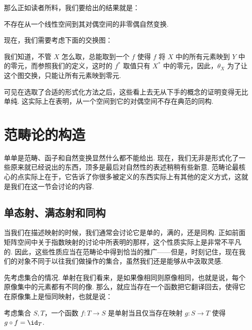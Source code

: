 那么正如读者所料，我们要给出的结果就是：

\begin{example}{}{}
    不存在从一个线性空间到其对偶空间的非零偶自然变换.

    现在，我们需要考虑下面的交换图：

    \begin{center}
    \end{center}

    我们知道，不管 $X$ 怎么取，总能取到一个 $f$ 使得 $f$ 将 $X$ 中的所有元素映到 $Y$ 中的零元，而参照我们的定义，这时的 $f^*$ 取值只有 $X^*$ 中的零元，因此，$\theta_X$ 为了让这个图交换，只能让所有元素映到零元.
\end{example}

可见在选取了合适的形式化方法之后，这些看上去无从下手的概念的证明变得无比单纯. 这实际上在表明，从一个空间到它的对偶空间不存在典范的同构.

\section{范畴论的构造}

单单是范畴、函子和自然变换显然什么都不能给出. 现在，我们无非是形式化了一些原来就已经说出的东西，顶多是最后对自然性的表述稍稍有些新意. 范畴论最核心的点实际上在于，它告诉了你很多被定义的东西实际上有其他的定义方式，这就是我们在这一节会讨论的内容.

\subsection{单态射、满态射和同构}

当我们在描述映射的时候，我们通常会讨论它是单的，满的，还是同构. 正如前面矩阵空间中关于指数映射的讨论中所表明的那样，这个性质实际上是非常不平凡的. 因此，这些性质应当在范畴论中得到恰当的推广——但是，时刻记住，现在我们的对象不同于以往我们做操作的集合，虽然我们还是能够从中汲取灵感.

先考虑集合的情况. 单射在我们看来，是如果像相同则原像相同，也就是说，每个原像集中的元素都有不同的像. 那么，就应当存在一个函数把它翻译回去，使得它在原像集上是恒同映射，也就是说：

\begin{lemma}{}{}
    考虑集合 $S, T$，一个函数 $f\colon T \to S$ 是单射当且仅当存在映射 $g\colon S \to T$ 使得 $g \circ f = \id_T$.
\end{lemma}

